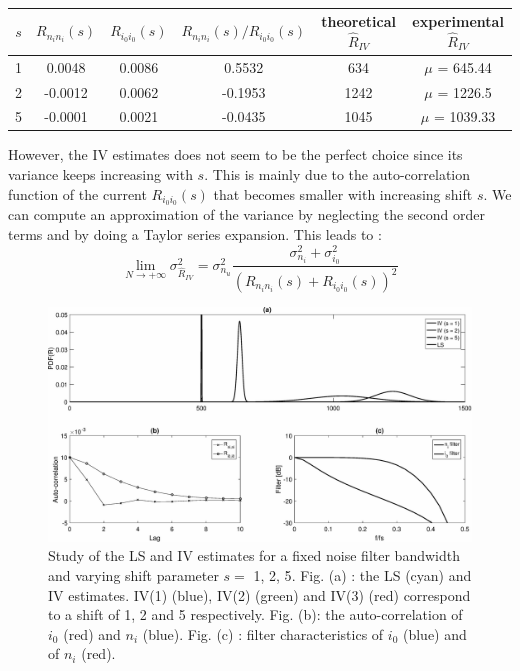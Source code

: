 \begin{table}[ht]
\centering
\begin{tabular}{|c|c|c|c|c|c|}
\hline
$s$ & $R_{n_i n_i}(s)$ & $R_{i_0 i_0}(s)$ & $R_{n_i n_i}(s)/R_{i_0 i_0}(s)$ & theoretical $\hat{R}_{IV}$ & experimental $\hat{R}_{IV}$ \\
\hline
\hline
1 & 0.0048 & 0.0086 & 0.5532 & 634 & $\mu$ = 645.44\\
\hline
2 & -0.0012 & 0.0062 & -0.1953 & 1242 & $\mu$ = 1226.5 \\
\hline
5 & -0.0001 & 0.0021 & -0.0435 & 1045 & $\mu$ = 1039.33 \\
\hline
\end{tabular}\caption{}\label{tab: Sess1_part1_exp2}
\end{table}
However, the IV estimates does not seem to be the perfect choice since its variance keeps increasing with $s$. This is mainly due to the auto-correlation function of the current $R_{i_0 i_0}(s)$  that becomes smaller with increasing shift $s$. We can compute an approximation of the variance by neglecting the second order terms and by doing a Taylor series expansion. This leads to :
\begin{equation}
\lim\limits_{N \rightarrow +\infty} \sigma^2_{\hat{R}_{IV}} = \sigma^2_{n_u} \frac{\sigma^2_{n_i}  + \sigma^2_{i_0}}{(R_{n_i n_i}(s) + R_{i_0 i_0}(s))^2}
\end{equation}


\begin{figure}[H]
    \centering
    \includegraphics[width=1\textwidth]{figures/Sess1_part1_exp2.eps}
    \caption{Study of the LS and IV estimates for a fixed noise filter bandwidth and varying shift parameter $s =$ {1, 2, 5}. Fig. (a) : the LS (cyan) and IV estimates. IV(1) (blue), IV(2) (green) and IV(3) (red) correspond to a shift of 1, 2 and 5 respectively. Fig. (b): the auto-correlation of $i_0$ (red) and $n_i$ (blue). Fig. (c) : filter characteristics of $i_0$ (blue) and of $n_i$ (red).}
    \label{fig: Sess1_part1_exp2}
\end{figure}
